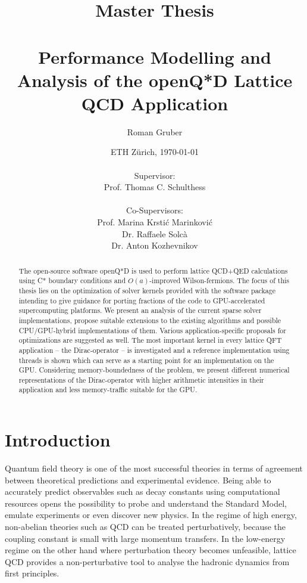\documentclass{article}
\title{Master Thesis \\~\\ Performance Modelling and Analysis of the openQ*D Lattice QCD Application}
\author{Roman Gruber}
\date{ETH Zürich, \today \\~\\ Supervisor: \\ Prof. Thomas C. Schulthess \\~\\ Co-Supervisors: \\ Prof. Marina Krstić Marinković \\ Dr. Raffaele Solcà \\ Dr. Anton Kozhevnikov}
\theoremstyle{plain} %
\theoremstyle{convention} %
\theoremstyle{remark} %
\numberwithin{equation}{section}
\begin{document}
\maketitle

\begin{abstract}

The open-source software openQ*D is used to perform lattice QCD+QED calculations using C* boundary conditions and $O(a)$-improved Wilson-fermions. The focus of this thesis lies on the optimization of solver kernels provided with the software package intending to give guidance for porting fractions of the code to GPU-accelerated supercomputing platforms. We present an analysis of the current sparse solver implementations, propose suitable extensions to the existing algorithms and possible CPU/GPU-hybrid implementations of them.  Various application-specific proposals for optimizations are suggested as well. The most important kernel in every lattice QFT application -- the Dirac-operator -- is investigated and a reference implementation using threads is shown which can serve as a starting point for an implementation on the GPU. Considering memory-boundedness of the problem, we present different numerical representations of the Dirac-operator with higher arithmetic intensities in their application and less memory-traffic suitable for the GPU.

\end{abstract}

\doclicenseThis

\newpage

\tableofcontents

\newpage

\section{Introduction}

Quantum field theory is one of the most successful theories in terms of agreement between theoretical predictions and experimental evidence. Being able to accurately predict observables such as decay constants using computational resources opens the possibility to probe and understand the Standard Model, emulate experiments or even discover new physics. In the regime of high energy, non-abelian theories such as \acrshort{QCD} can be treated perturbatively, because the coupling constant is small with large momentum transfers. In the low-energy regime on the other hand where perturbation theory becomes unfeasible, lattice QCD provides a non-perturbative tool to analyse the hadronic dynamics from first principles.
\end{document}
